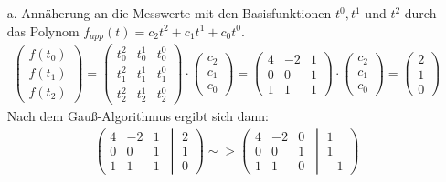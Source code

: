	\begin{itemize}
		\item[a.] Annäherung an die Messwerte mit den Basisfunktionen $t^0,t^1$ und $t^2$ durch das Polynom $f_{app}(t) = c_2t^2 + c_1t^1 + c_0t^0$.
		\begin{align*}
			\left(\begin{matrix}f(t_0) \\ f(t_1) \\ f(t_2) \end{matrix}\right)
			= \left(\begin{matrix} t_0^2 & t_0^1 & t_0^0\\t_1^2 & t_1^1 & t_1^0\\t_2^2 & t_2^1 & t_2^0\end{matrix}\right)\cdot\left(\begin{matrix}c_2\\c_1\\c_0\end{matrix}\right)
			= \left(\begin{matrix} 4 & -2 & 1\\0 & 0 & 1\\ 1 & 1 & 1\end{matrix}\right)\cdot\left(\begin{matrix}c_2\\c_1\\c_0\end{matrix}\right) = \left(\begin{matrix}2 \\ 1 \\ 0 \end{matrix}\right)
		\end{align*}
		Nach dem Gauß-Algorithmus ergibt sich dann:
		\begin{align*}
			\left(\left.\begin{matrix} 4 & -2 & 1\\0 & 0 & 1\\ 1 & 1 & 1\end{matrix}\ \ \right|\ \begin{matrix}2 \\ 1 \\ 0 \end{matrix}\right)
			\sim> \left(\left.\begin{matrix} 4 & -2 & 0\\0 & 0 & 1\\ 1 & 1 & 0\end{matrix}\ \ \right|\ \begin{matrix}1 \\ 1 \\ -1 \end{matrix}\right)

\end{align*}
\end{itemize}
